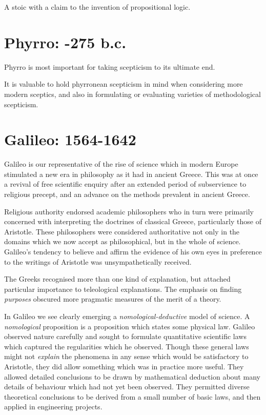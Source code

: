 A stoic with a claim to the invention of propositional logic.

\section{Phyrro: -275 b.c.}

Phyrro is most important for taking scepticism to its ultimate end.

It is valuable to hold phyrronean scepticism in mind when considering more modern sceptics, and also in formulating or evaluating varieties of methodological scepticism.


\section{Galileo: 1564-1642}

Galileo is our representative of the rise of science which in modern Europe stimulated a new era in philosophy as it had in ancient Greece.
This was at once a revival of free scientific enquiry after an extended period of subservience to religious precept, and an advance on the methods prevalent in ancient Greece.

Religious authority endorsed academic philosophers who in turn were primarily concerned with interpreting the doctrines of classical Greece, particularly those of Aristotle.
These philosophers were considered authoritative not only in the domains which we now accept as philosophical, but in the whole of science.
Galileo's tendency to believe and affirm the evidence of his own eyes in preference to the writings of Aristotle was unsympathetically received.

The Greeks recognised more than one kind of explanation, but attached particular importance to teleological explanations.
The emphasis on finding {\it purposes} obscured more pragmatic measures of the merit of a theory.

In Galileo we see clearly emerging a {\it nomological-deductive} model of science.
A {\it nomological} proposition is a proposition which states some physical law.
Galileo observed nature carefully and sought to formulate quantitative scientific laws which captured the regularities which he observed.
Though these general laws might not {\it explain} the phenomena in any sense which would be satisfactory to Aristotle, they did allow something which was in practice more useful.
They allowed detailed conclusions to be drawn by mathematical deduction about many details of behaviour which had not yet been observed.
They permitted diverse theoretical conclusions to be derived from a small number of basic laws, and then applied in engineering projects.

